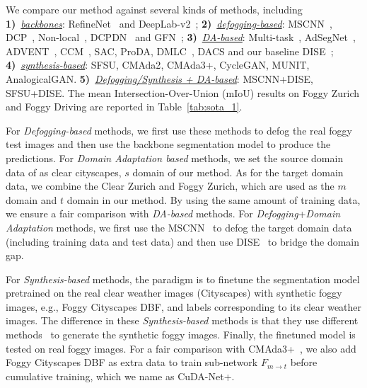 \documentclass[10pt,twocolumn,letterpaper]{article}
\def\model{F}
\def\td{t}
\begin{document}
We compare our method against several kinds of methods, including
\textbf{1)}~\underline{\emph{backbones}}: RefineNet~\cite{lin2017refinenet} and DeepLab-v2~\cite{chen2017deeplab}; 
\textbf{2)}~\underline{\emph{defogging-based}}: MSCNN~\cite{ren2016single}, DCP~\cite{he2010single}, Non-local~\cite{berman2016non}, DCPDN~\cite{zhang2018densely} and GFN~\cite{ren2018gated};
\textbf{3)}~\underline{\emph{DA-based}}: Multi-task~\cite{alshammari2020competitive}, AdSegNet~\cite{tsai2018learning}, ADVENT~\cite{vu2019advent}, CCM~\cite{li2020content}, SAC\cite{araslanov2021self}, ProDA\cite{zhang2021prototypical}, DMLC~\cite{guo2021metacorrection}, DACS\cite{tranheden2021dacs} and our baseline DISE~\cite{chang2019all}; 
\textbf{4)}~\underline{\emph{synthesis-based}}: SFSU\cite{sakaridis2018semantic}, CMAda2\cite{sakaridis2018model}, CMAda3+\cite{dai2020curriculum}, CycleGAN\cite{zhu2017unpaired}, MUNIT\cite{huang2018multimodal}, AnalogicalGAN\cite{gong2021analogical}. 
\textbf{5)}~\underline{\emph{Defogging/Synthesis + DA-based}}: MSCNN+DISE, SFSU+DISE.
The mean Intersection-Over-Union (mIoU) results on Foggy Zurich and Foggy Driving are reported in Table~\ref{tab:sota_1}.

For \emph{Defogging-based} methods, we first use these methods to defog the real foggy test images and then use the backbone segmentation model to produce the predictions.
For \emph{Domain Adaptation based} methods, we set the source domain data of as clear cityscapes, $s$ domain of our method. As for the target domain data, we combine the Clear Zurich and Foggy Zurich, which are used as the $m$ domain and $t$ domain in our method. 
By using the same amount of training data, we ensure a fair comparison with \emph{DA-based} methods.
For \emph{Defogging}+\emph{Domain Adaptation} methods, we first use the MSCNN~\cite{ren2016single} to defog the target domain data (including training data and test data) and then use DISE~\cite{chang2019all} to bridge the domain gap.

For \emph{Synthesis-based} methods, the paradigm is to finetune the segmentation model pretrained on the real clear weather images (Cityscapes) with synthetic foggy images, e.g., Foggy Cityscapes DBF, and labels corresponding to its clear weather images. The difference in these \emph{Synthesis-based} methods is that they use different methods~\cite{sakaridis2018semantic,sakaridis2018model,gong2021analogical,zhu2017unpaired,huang2018multimodal} to generate the synthetic foggy images. Finally, the finetuned model is tested on real foggy images.
For a fair comparison with CMAda3+~\cite{dai2020curriculum}, we also add Foggy Cityscapes DBF as extra data to train sub-network $\model_{m \rightarrow \td}$ before cumulative training, which we name as CuDA-Net+.
\end{document}
